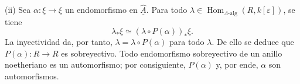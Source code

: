 (ii) Sea $\alpha:\xi\longrightarrow\xi$ un endomorfismo en
$\widehat{\underline A}$. Para todo
$\lambda\in\operatorname{Hom}_{\Lambda\text{-alg}}
(R,k[\varepsilon])$, se tiene
\[
 \lambda_*\xi\simeq
 (\lambda\circ P(\alpha))_*\xi.
\]
La inyectividad da, por tanto,
$\lambda=\lambda\circ P(\alpha)$ para todo $\lambda$. De ello se
deduce que $P(\alpha):R\longrightarrow R$ es sobreyectivo. Todo
endomorfismo sobreyectivo de un anillo noetheriano es un automorfismo;
por consiguiente, $P(\alpha)$ y, por ende, $\alpha$ son automorfismos.

